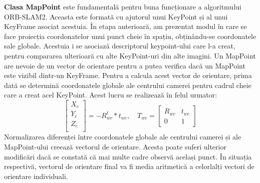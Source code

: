 \documentclass[12pt,a4paper]{report}
\begin{document}
\textbf{Clasa MapPoint} este fundamentală pentru buna funcționare a algoritmului ORB-SLAM2. Aceasta este 
formată cu ajutorul unui KeyPoint și al unui KeyFrame asociat acestuia. În etapa anterioară, 
am prezentat modul în care se face proiecția coordonatelor unui punct cheie în spațiu, obținându-se 
coordonatele sale globale. Acestuia i se asociază descriptorul keypoint-ului care l-a creat, pentru
compararea ulterioară cu alte KeyPoint-uri din alte imagini. Un MapPoint are nevoie de un vector de orientare
pentru a putea verifica dacă un MapPoint este vizibil dintr-un KeyFrame. Pentru a 
calcula acest vector de orientare, prima dată se determină coordonatele globale ale centrului camerei
pentru cadrul cheie care a creat acel KeyPoint. Acest lucru se realizează în felul urmator:
\begin{equation}
    \begin{bmatrix}
        X_{c} \\
        Y_{c} \\
        Z_{c} \\
        \end{bmatrix} = -R_{wc}^t * t_{wc}, \quad{}  
        T_{wc} =     
     \begin{bmatrix}
            R_{wc} & t_{wc} \\
            0 & 1
        \end{bmatrix}
\end{equation} 
Normalizarea diferenței între coordonatele globale ale centrului camerei și ale MapPoint-ului creează
vectorul de orientare. Acesta poate suferi ulterior modificări dacă se constată că mai multe cadre observă același
punct. În situația respectivă, vectorul de orientare final va fi media aritmetică a celorlalți vectori 
de orientare individuali.
\end{document}

